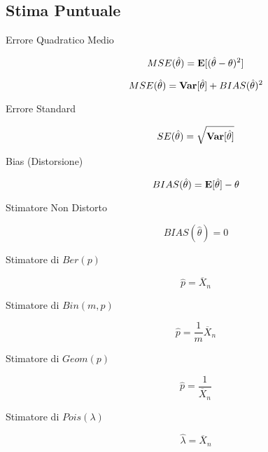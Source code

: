 \subsection{Stima Puntuale}

\begin{description}
	
	\item[Errore Quadratico Medio]
	\begin{equation}
	MSE(\hat{\theta})=\mathbf{E}[(\hat{\theta}-\theta)^{2}]
	\end{equation}
	
	\begin{equation}
	MSE(\hat{\theta})=\mathbf{Var}[\hat{\theta}]+BIAS(\hat{\theta})^{2}
	\end{equation}
	
	\item[Errore Standard]
	\begin{equation}
	SE(\hat{\theta})=\sqrt{\mathbf{Var}[\hat{\theta}]}
	\end{equation}
	
	\item[Bias (Distorsione)]
	\begin{equation}
	BIAS(\hat{\theta})=\mathbf{E}[\hat{\theta}]-\theta
	\end{equation}
	
	\item[Stimatore Non Distorto]
	\begin{equation}
	BIAS(\hat{\theta})=0
	\end{equation}

	\item[Stimatore di $Ber(p)$]
	\begin{equation}
	\hat{p} = \overline{X}_{n}
	\end{equation}
	
	\item[Stimatore di $Bin(m,p)$]
	\begin{equation}
	\hat{p} = \frac{1}{m} \overline{X}_{n}
	\end{equation}
	
	\item[Stimatore di $Geom(p)$]
	\begin{equation}
	\hat{p} = \frac{1}{\overline{X}_{n}}
	\end{equation}
	
	\item[Stimatore di $Pois(\lambda)$]
	\begin{equation}
	\hat{\lambda} = \overline{X}_{n}
	\end{equation}
	

\end{description}
